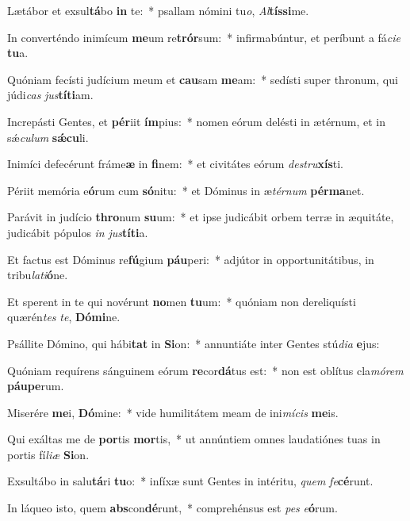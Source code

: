 \item Lætábor et exsul\textbf{tá}bo \textbf{in} te:~* psallam nómini tu\textit{o}, \textit{Al}\textbf{tís}\textbf{si}me.
\item In converténdo inimícum \textbf{me}um re\textbf{trór}sum:~* infirmabúntur, et períbunt a fá\textit{ci}\textit{e} \textbf{tu}a.
\item Quóniam fecísti judícium meum et \textbf{cau}sam \textbf{me}am:~* sedísti super thronum, qui júdi\textit{cas} \textit{jus}\textbf{tí}\textbf{ti}am.
\item Increpásti Gentes, et \textbf{pér}iit \textbf{ím}pius:~* nomen eórum delésti in ætérnum, et in sǽ\textit{cu}\textit{lum} \textbf{sǽ}\textbf{cu}li.
\item Inimíci defecérunt fráme\textbf{æ} in \textbf{fi}nem:~* et civitátes eórum \textit{de}\textit{stru}\textbf{xís}ti.
\item Périit memória e\textbf{ó}rum cum \textbf{só}nitu:~* et Dóminus in æ\textit{tér}\textit{num} \textbf{pér}\textbf{ma}net.
\item Parávit in judício \textbf{thro}num \textbf{su}um:~* et ipse judicábit orbem terræ in æquitáte, judicábit pópulos \textit{in} \textit{jus}\textbf{tí}\textbf{ti}a.
\item Et factus est Dóminus re\textbf{fú}gium \textbf{páu}peri:~* adjútor in opportunitátibus, in tribu\textit{la}\textit{ti}\textbf{ó}ne.
\item Et sperent in te qui novérunt \textbf{no}men \textbf{tu}um:~* quóniam non dereliquísti quærén\textit{tes} \textit{te}, \textbf{Dó}\textbf{mi}ne.
\item Psállite Dómino, qui hábi\textbf{tat} in \textbf{Si}on:~* annuntiáte inter Gentes stú\textit{di}\textit{a} \textbf{e}jus:
\item Quóniam requírens sánguinem eórum \textbf{re}cor\textbf{dá}tus est:~* non est oblítus cla\textit{mó}\textit{rem} \textbf{páu}\textbf{pe}rum.
\item Miserére \textbf{me}i, \textbf{Dó}mine:~* vide humilitátem meam de ini\textit{mí}\textit{cis} \textbf{me}is.
\item Qui exáltas me de \textbf{por}tis \textbf{mor}tis,~* ut annúntiem omnes laudatiónes tuas in portis fí\textit{li}\textit{æ} \textbf{Si}on.
\item Exsultábo in salu\textbf{tá}ri \textbf{tu}o:~* infíxæ sunt Gentes in intéritu, \textit{quem} \textit{fe}\textbf{cé}runt.
\item In láqueo isto, quem \textbf{abs}con\textbf{dé}runt,~* comprehénsus est \textit{pes} \textit{e}\textbf{ó}rum.
